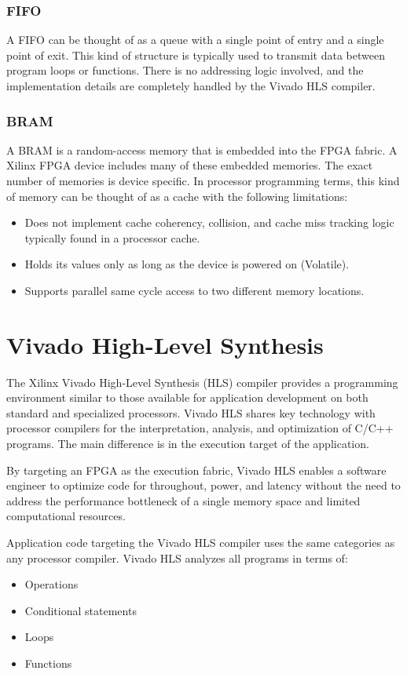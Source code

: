 \subsubsection{FIFO}
A FIFO can be thought of as a queue with a single point of entry and a single point of exit. This kind of structure is typically used to transmit data between program loops or functions. There is no addressing logic involved, and the implementation details are completely handled by the Vivado HLS compiler.

\subsubsection{BRAM}
A BRAM is a random-access memory that is embedded into the FPGA fabric. A Xilinx FPGA device includes many of these embedded memories. The exact number of memories is device specific. In processor programming terms, this kind of memory can be thought of as
a cache with the following limitations:

\begin{itemize}
  \item Does not implement cache coherency, collision, and cache miss tracking logic typically found in a processor cache.
  \item Holds its values only as long as the device is powered on (Volatile).
  \item Supports parallel same cycle access to two different memory locations.
\end{itemize}
\clearpage

\section {Vivado High-Level Synthesis}
  The Xilinx Vivado High-Level Synthesis (HLS) compiler provides a programming environment similar to those available for application development on both standard and specialized processors. Vivado HLS shares key technology with processor compilers for the
  interpretation, analysis, and optimization of C/C++ programs. The main difference is in the execution target of the application.
  
  \par By targeting an FPGA as the execution fabric, Vivado HLS enables a software engineer to optimize code for throughout, power, and latency without the need to address the
  performance bottleneck of a single memory space and limited computational resources.
  
  \par Application code targeting the Vivado HLS compiler uses the same categories as any processor compiler. Vivado HLS analyzes all programs in terms of:
  \begin{itemize}
    \item Operations
    \item Conditional statements
    \item Loops
    \item Functions
  \end{itemize}

